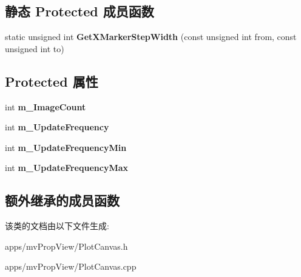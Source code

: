 \subsection*{静态 Protected 成员函数}
\begin{DoxyCompactItemize}
\item 
\hypertarget{class_plot_canvas_a1346e9c291fbee3cada9f757f8dd12fd}{static unsigned int {\bfseries Get\+X\+Marker\+Step\+Width} (const unsigned int from, const unsigned int to)}\label{class_plot_canvas_a1346e9c291fbee3cada9f757f8dd12fd}

\end{DoxyCompactItemize}
\subsection*{Protected 属性}
\begin{DoxyCompactItemize}
\item 
\hypertarget{class_plot_canvas_abd4a6690f369d0a73d69d0053dc3c2c9}{int {\bfseries m\+\_\+\+Image\+Count}}\label{class_plot_canvas_abd4a6690f369d0a73d69d0053dc3c2c9}

\item 
\hypertarget{class_plot_canvas_a0bec66c9cae1f6fba5ad13eb928c2184}{int {\bfseries m\+\_\+\+Update\+Frequency}}\label{class_plot_canvas_a0bec66c9cae1f6fba5ad13eb928c2184}

\item 
\hypertarget{class_plot_canvas_ae865582d895070a4013bfe6d69b2f17a}{int {\bfseries m\+\_\+\+Update\+Frequency\+Min}}\label{class_plot_canvas_ae865582d895070a4013bfe6d69b2f17a}

\item 
\hypertarget{class_plot_canvas_a44d99e757507e301b366e4169ff9346f}{int {\bfseries m\+\_\+\+Update\+Frequency\+Max}}\label{class_plot_canvas_a44d99e757507e301b366e4169ff9346f}

\end{DoxyCompactItemize}
\subsection*{额外继承的成员函数}


该类的文档由以下文件生成\+:\begin{DoxyCompactItemize}
\item 
apps/mv\+Prop\+View/Plot\+Canvas.\+h\item 
apps/mv\+Prop\+View/Plot\+Canvas.\+cpp\end{DoxyCompactItemize}
